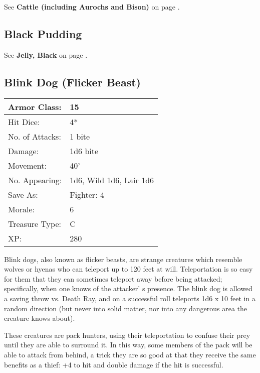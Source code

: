 \documentclass[a4paper,twoside,openany,10pt]{book}
\begin{document}
\begin{multicols}{2}
See \textbf{Cattle (including Aurochs and Bison)} on page \hyperlink{cattle-including-aurochs-and-bison}{\pageref{cattle-including-aurochs-and-bison}}.

\subsection*{Black Pudding}\label{black-pudding}

See \textbf{Jelly, Black} on page \hyperlink{jelly-black-black-pudding}{\pageref{jelly-black-black-pudding}}.

\subsection*{Blink Dog (Flicker Beast)}\label{blink-dog-flicker-beast}

\begin{tabularx}{0.48\textwidth}{@{}lX@{}}
Armor Class: & 15 \\\hline
Hit Dice: & 4* \\\hline
No. of Attacks: & 1 bite \\\hline
Damage: & 1d6 bite \\\hline
Movement: & 40' \\\hline
No. Appearing: & 1d6, Wild 1d6, Lair 1d6 \\\hline
Save As: & Fighter: 4 \\\hline
Morale: & 6 \\\hline
Treasure Type: & C \\\hline
XP: & 280 \\\hline
\end{tabularx}\medskip

Blink dogs, also known as flicker beasts, are strange creatures which resemble wolves or hyenas who can teleport up to 120 feet at will. Teleportation is so easy for them that they can sometimes teleport away before being attacked; specifically, when one knows of the attacker' s presence. The blink dog is allowed a saving throw vs. Death Ray, and on a successful roll teleports 1d6 x 10 feet in a random direction (but never into solid matter, nor into any dangerous area the creature knows about).

These creatures are pack hunters, using their teleportation to confuse their prey until they are able to surround it. In this way, some members of the pack will be able to attack from behind, a trick they are so good at that they receive the same benefits as a thief: +4 to hit and double damage if the hit is successful.


\end{multicols}
\end{document}
